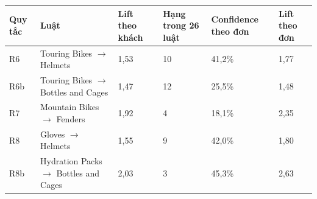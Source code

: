 \begin{tabular}{lp{4.6cm}R{1.9cm}R{1.9cm}R{2.1cm}R{1.9cm}}
\toprule
Quy tắc & Luật & Lift theo khách & Hạng trong 26 luật & Confidence theo đơn & Lift theo đơn \\
\midrule
R6 & Touring Bikes $\rightarrow$ Helmets & 1,53 & 10 & 41,2\% & 1,77 \\
R6b & Touring Bikes $\rightarrow$ Bottles and Cages & 1,47 & 12 & 25,5\% & 1,48 \\
R7 & Mountain Bikes $\rightarrow$ Fenders & 1,92 & 4 & 18,1\% & 2,35 \\
R8 & Gloves $\rightarrow$ Helmets & 1,55 & 9 & 42,0\% & 1,80 \\
R8b & Hydration Packs $\rightarrow$ Bottles and Cages & 2,03 & 3 & 45,3\% & 2,63 \\
\bottomrule
\end{tabular}
